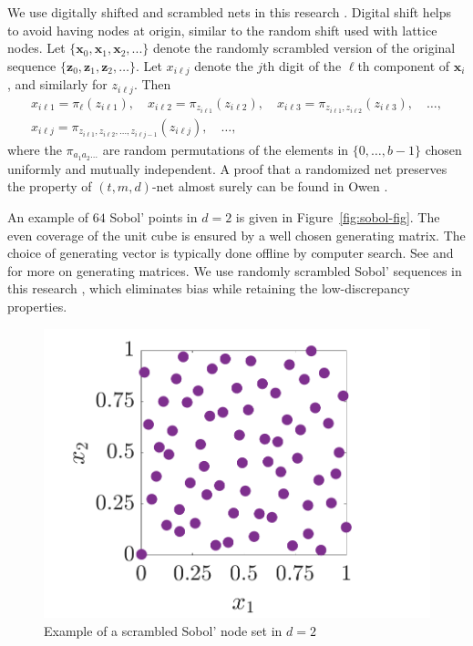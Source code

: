 \documentclass{iitthesis}          %
\newcommand{\bm}[1]{\boldsymbol{#1}}
\newcommand{\vx}{\bm{x}}
\newcommand{\vz}{\bm{z}}
\newcommand\figref{Figure~\ref}
\newcommand{\JRNote}[1]{{\textcolor{green}{JR: #1}}}
\begin{document}
We use digitally shifted and scrambled nets in this research \cite{HicYue00}. Digital shift helps to avoid having nodes at origin, similar to the random shift used with lattice nodes.
Let $\{\vx_0, \vx_1, \vx_2, ...\}$ denote the randomly scrambled version of the original sequence $\{\vz_0, \vz_1, \vz_2, \dots \}$. Let $x_{i{\ell}j}$ denote the $j$\textup{th} digit of the $\ell$\textup{th} component of $\vx_i$, and similarly for $z_{i{\ell}j}$. Then
\begin{align*}
x_{i{\ell}1} = \pi_{\ell}( z_{i{\ell}1}), \quad x_{i{\ell}2} = \pi_{z_{i{\ell}1}} ( z_{i{\ell}2}), \quad x_{i{\ell}3} = \pi_{z_{i{\ell}1}, z_{i{\ell}2}} ( z_{i{\ell}3}), \quad \dots , \\
x_{i{\ell}j} = \pi_{z_{i{\ell} 1}, z_{i{\ell}2}, \dots, z_{i{\ell}j-1}} ( z_{i{\ell}j}), \quad \dots , \qquad \qquad \qquad
\end{align*}
where the $\pi_{a_1a_2 \dots}$ are random permutations of the elements in $\{0,\dots,b-1\}$ chosen uniformly and mutually independent. A proof that a randomized net preserves the property of $(t, m, d)$-net almost surely can be found in Owen \cite{Owe95}.

An example of $64$ Sobol' points in $d=2$ is given in \figref{fig:sobol-fig}.  The even coverage of the unit cube is ensured by a well chosen generating matrix.  The choice of generating vector is typically done offline by computer search.  See \cite{KuoNuyens2016} and \cite{NuySoft} for more on generating matrices. We use randomly scrambled Sobol' sequences in this research \cite{HonHic00a},  which eliminates bias while retaining the low-discrepancy properties. 

\begin{figure}[htp]
	\label{fig:sobol-fig}
	\centering
	\includegraphics[width=0.8\linewidth]{SSobolPoints}
	\caption{Example of a scrambled Sobol' node set  in $d=2$ \label{sobolfig} }
\end{figure}
\end{document}

